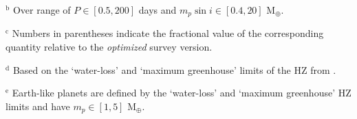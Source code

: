 \begin{landscape}
\begin{table*}
\begin{list}{}{}
     \item $^{\text{b}}$ Over range of $P \in [0.5,200]$ days and $m_p\sin{i} \in [0.4,20]$ M$_{\oplus}$.
     \item $^{\text{c}}$ Numbers in parentheses indicate the fractional value of the corresponding quantity relative to the \emph{optimized} survey version.
     \item $^{\text{d}}$ Based on the `water-loss' and `maximum greenhouse' limits of the HZ from \cite{kopparapu13}.
     \item $^{\text{e}}$ Earth-like planets are defined by the `water-loss' and `maximum greenhouse' HZ limits \citep{kopparapu13} and have $m_p \in [1,5]$ M$_{\oplus}$.
     \end{list}
\end{table*}
\clearpage
\end{landscape}
